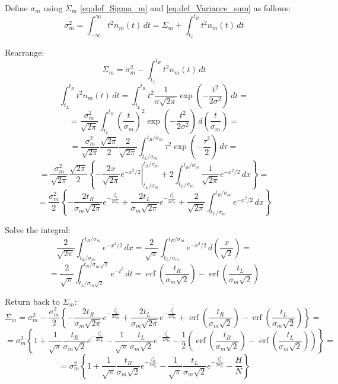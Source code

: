 \documentclass[12pt]{article}
\begin{document}
Define \( \sigma_m \) using \(\Sigma_m\) \eqref{eq:def_Sigma_m} and \eqref{eq:def_Variance_sum} as follows:
\[
\sigma_m^2 = \int_{-\infty}^{\infty} t^2 n_m(t) \,dt =
\Sigma_m + \int_{t_L}^{t_R} t^2 n_m(t) \,dt
\]

Rearrange:
\[
\Sigma_m = \sigma_m^2 - \int_{t_L}^{t_R} t^2 n_m(t) \,dt
\]
\[
\int_{t_L}^{t_R} t^2 n_m(t) \,dt =
\int_{t_L}^{t_R} t^2 \frac{1}{\sigma\sqrt{2 \pi }} \exp\left(-\frac{t^2}{2\sigma^2} \right) \,dt =
\]
\[
    = \frac{\sigma_m^2}{\sqrt{2\pi}}
    \int_{t_L}^{t_R}
    \left(\frac{t}{\sigma_m}\right)^2
    \exp\left(-\frac{t^2}{2\sigma^2} \right)
    \,d\left(\frac{t}{\sigma_m}\right) =
\]
\[
    = \frac{\sigma_m^2}{\sqrt{2\pi}}
    \frac{\sqrt{2\pi}}{2}
    \frac{2}{\sqrt{2\pi}}
    \int_{t_L/\sigma_m}^{t_R/\sigma_m}
    \tau^2
    \exp\left(-\frac{\tau^2}{2} \right)
    \,d\tau =
\]
\[
    = \frac{\sigma_m^2}{\sqrt{2\pi}}
    \frac{\sqrt{2\pi}}{2}
    \left\{
        \left.
        -\frac{2x}{\sqrt{2\pi}} e^{-x^2/2}
        \right|_{t_L/\sigma_m}^{t_R/\sigma_m} +
        2 \int_{t_L/\sigma_m}^{t_R/\sigma_m}
        \frac{1}{\sqrt{2\pi}} e^{-x^2/2} \,dx
    \right\} =
\]
\[
    = \frac{\sigma_m^2}{2}
    \left\{
        -\frac{2t_R}{\sigma_m\sqrt{2\pi}} e^{-\frac{t_R^2}{2\sigma_m^2}} +
        \frac{2t_L}{\sigma_m\sqrt{2\pi}} e^{-\frac{t_L^2}{2\sigma_m^2}} +
        \frac{2}{\sqrt{2\pi}} \int_{t_L/\sigma_m}^{t_R/\sigma_m}
        e^{-x^2/2} \,dx
    \right\}
\]

Solve the integral:
\[
    \frac{2}{\sqrt{2\pi}} \int_{t_L/\sigma_m}^{t_R/\sigma_m}
    e^{-x^2/2} \,dx =
    \frac{2}{\sqrt{\pi}} \int_{t_L/\sigma_m}^{t_R/\sigma_m}
    e^{-x^2/2} \,d\left(\frac{x}{\sqrt{2}}\right) =
\]
\[
    = \frac{2}{\sqrt{\pi}} \int_{t_L/\sigma_m\sqrt{2}}^{t_R/\sigma_m\sqrt{2}}
    e^{-t^2} \,dt =
    \operatorname{erf} \left(\frac{t_R}{\sigma_m\sqrt{2}}\right) -
    \operatorname{erf} \left(\frac{t_L}{\sigma_m\sqrt{2}}\right)
\]

Return back to \(\Sigma_m\):
\[
\Sigma_m = \sigma_m^2 -
\frac{\sigma_m^2}{2}
\left\{
    -\frac{2t_R}{\sigma_m\sqrt{2\pi}} e^{-\frac{t_R^2}{2\sigma_m^2}} +
    \frac{2t_L}{\sigma_m\sqrt{2\pi}} e^{-\frac{t_L^2}{2\sigma_m^2}} +
    \operatorname{erf} \left(\frac{t_R}{\sigma_m\sqrt{2}}\right) -
    \operatorname{erf} \left(\frac{t_L}{\sigma_m\sqrt{2}}\right)
\right\} =
\]
\[
= \sigma_m^2
\left\{
    1 +
    \frac{1}{\sqrt{\pi}} \frac{t_R}{\sigma_m\sqrt{2}} e^{-\frac{t_R^2}{2\sigma_m^2}} -
    \frac{1}{\sqrt{\pi}} \frac{t_L}{\sigma_m\sqrt{2}} e^{-\frac{t_L^2}{2\sigma_m^2}} -
    \frac{1}{2} \left(
        \operatorname{erf} \left(\frac{t_R}{\sigma_m\sqrt{2}}\right) -
        \operatorname{erf} \left(\frac{t_L}{\sigma_m\sqrt{2}}\right)
    \right)
\right\} =
\]
\[
= \sigma_m^2
\left\{
    1 +
    \frac{1}{\sqrt{\pi}} \frac{t_R}{\sigma_m\sqrt{2}} e^{-\frac{t_R^2}{2\sigma_m^2}} -
    \frac{1}{\sqrt{\pi}} \frac{t_L}{\sigma_m\sqrt{2}} e^{-\frac{t_L^2}{2\sigma_m^2}} -
    \frac{H}{N}
\right\}
\]
\end{document}
